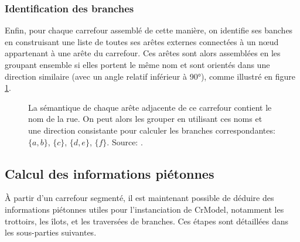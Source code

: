 \subsubsection{Identification des branches}

\newpar{}

Enfin, pour chaque carrefour assemblé de cette manière, on identifie ses banches en construisant une liste de toutes ses arêtes externes connectées à un nœud appartenant à une arête du carrefour. Ces arêtes sont alors assemblées en les groupant ensemble si elles portent le même nom et sont orientés dans une direction similaire (avec un angle relatif inférieur à 90°), comme illustré en figure \ref{fig:modelisation_mergeBranches}.

\begin{figure}[ht]
    \centering
    \caption[Identification des branches d'un carrefour]{La sémantique de chaque arête adjacente de ce carrefour contient le nom de la rue. On peut alors les grouper en utilisant ces noms et une direction consistante pour calculer les branches correspondantes: $\{a, b\}$, $\{c\}$, $\{d, e\}$, $\{f\}$. Source: \citep{Favreau2022}.}
    \label{fig:modelisation_mergeBranches}
\end{figure}

\subsection{Calcul des informations piétonnes}

\label{sec:modelisation_calcul_info_pietonnes}

À partir d'un carrefour segmenté, il est maintenant possible de déduire des informations piétonnes utiles pour l'instanciation de CrModel, notamment les trottoirs, les îlots, et les traversées de branches. Ces étapes sont détaillées dans les sous-parties suivantes.

